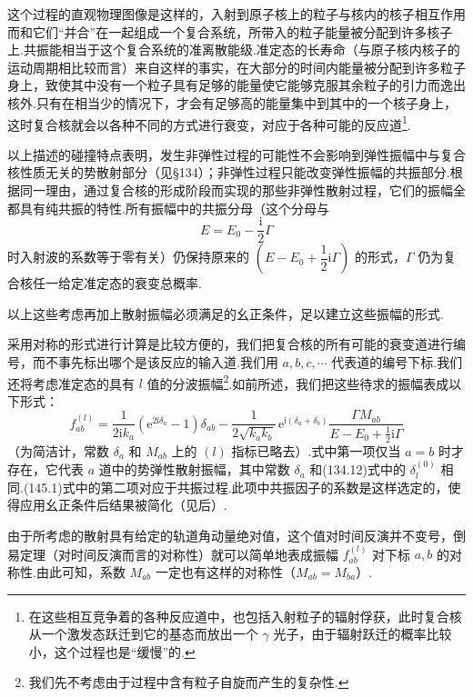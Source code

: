 这个过程的直观物理图像是这样的，入射到原子核上的粒子与核内的核子相互作用而和它们“并合”在一起组成一个复合系统，所带入的粒子能量被分配到许多核子上.共振能相当于这个复合系统的准离散能级.准定态的长寿命（与原子核内核子的运动周期相比较而言）来自这样的事实，在大部分的时间内能量被分配到许多粒子身上，致使其中没有一个粒子具有足够的能量使它能够克服其余粒子的引力而逸出核外.只有在相当少的情况下，才会有足够高的能量集中到其中的一个核子身上，这时复合核就会以各种不同的方式进行衰变，对应于各种可能的反应道\footnote{在这些相互竞争着的各种反应道中，也包括入射粒子的辐射俘获，此时复合核从一个激发态跃迁到它的基态而放出一个 $\gamma$ 光子，由于辐射跃迁的概率比较小，这个过程也是“缓慢”的.}.

以上描述的碰撞特点表明，发生非弹性过程的可能性不会影响到弹性振幅中与复合核性质无关的势散射部分（见§134）；非弹性过程只能改变弹性振幅的共振部分.根据同一理由，通过复合核的形成阶段而实现的那些非弹性散射过程，它们的振幅全都具有纯共振的特性.所有振幅中的共振分母（这个分母与
\begin{equation*}
  E=E_0-\frac{\mathrm{i}}{2}\Gamma
\end{equation*}
时入射波的系数等于零有关）仍保持原来的 $\left(E-E_0+\dfrac{1}{2}\mathrm{i}\Gamma\right)$ 的形式，$\Gamma$ 仍为复合核任一给定准定态的衰变总概率.

以上这些考虑再加上散射振幅必须满足的幺正条件，足以建立这些振幅的形式.

采用对称的形式进行计算是比较方便的，我们把复合核的所有可能的衰变道进行编号，而不事先标出哪个是该反应的输入道.我们用 $a,b,c,\cdots$ 代表道的编号下标.我们还将考虑准定态的具有 $l$ 值的分波振幅\footnote{我们先不考虑由于过程中含有粒子自旋而产生的复杂性.}.如前所述，我们把这些待求的振幅表成以下形式：
\begin{equation}
  f_{ab}^{(l)}=\frac{1}{2\mathrm{i}k_a}\left(\mathrm{e}^{2\mathrm{i}\delta_a}-1\right)\delta_{ab}
  -\frac{1}{2\sqrt{k_ak_b}}\,\mathrm{e}^{\mathrm{i}(\delta_a+\delta_b)}
  \frac{\Gamma M_{ab}}{E-E_0+\frac{1}{2}\mathrm{i}\Gamma}
\end{equation}
（为简洁计，常数 $\delta_a$ 和 $M_{ab}$ 上的 $(l)$ 指标已略去）.式中第一项仅当 $a=b$ 时才存在，它代表 $a$ 道中的势弹性散射振幅，其中常数 $\delta_a$ 和(134.12)式中的 $\delta_l^{(0)}$ 相同.(145.1)式中的第二项对应于共振过程.此项中共振因子的系数是这样选定的，使得应用幺正条件后结果被简化（见后）.

由于所考虑的散射具有给定的轨道角动量绝对值，这个值对时间反演并不变号，倒易定理（对时间反演而言的对称性）就可以简单地表成振幅 $f_{ab}^{(l)}$ 对下标 $a,b$ 的对称性.由此可知，系数 $M_{ab}$ 一定也有这样的对称性（$M_{ab}=M_{ba}$）.

